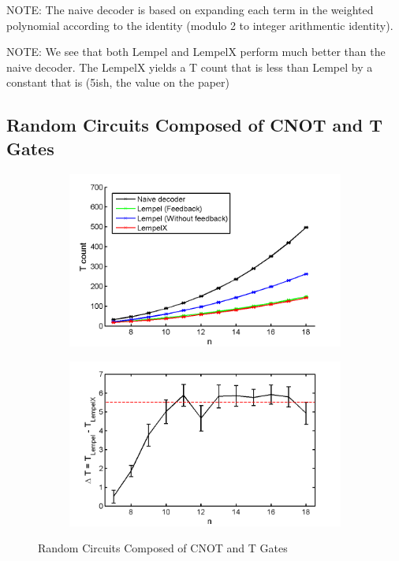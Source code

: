\documentclass{article}
\theoremstyle{definition}
\theoremstyle{problem}
\theoremstyle{lemma}
\begin{document}
			NOTE: The naive decoder is based on expanding each term in the weighted polynomial according to the identity (modulo 2 to integer arithmentic identity).
			
			NOTE: We see that both Lempel and LempelX perform much better than the naive decoder. The LempelX yields a T count that is less than Lempel by a constant that is (5ish, the value on the paper)
			
			\label{s5_Results}
				\subsection{Random Circuits Composed of CNOT and T Gates}
				\begin{figure}
					\centering
					\begin{subfigure}[b]{0.6\textwidth}
						\includegraphics[width=\textwidth]{LX_vs_Lempel}
						\caption{}
					\end{subfigure}
					\begin{subfigure}[b]{0.6\textwidth}
						\includegraphics[width=\textwidth]{DeltaT}
						\caption{}
					\end{subfigure}
					\caption{Random Circuits Composed of CNOT and T Gates}
				\end{figure}
				
\end{document}
